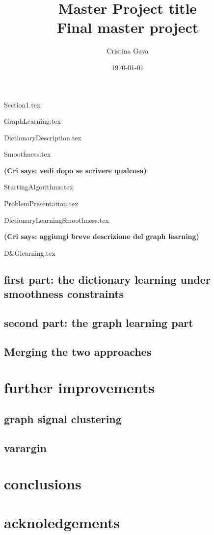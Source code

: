 \documentclass[11pt,a4paper,titlepage]{book}
\title{\blue Master Project title \\
\blueb Final master project}
\author{Cristina Gava}
\date{\today}
\newcommand{\cri}[1]{\textcolor{MyColor2}{\textbf{(Cri says: #1)}}}
\begin{document}
\maketitle

\tableofcontents

{Section1.tex}

{GraphLearning.tex}

{DictionaryDescription.tex}

{Smoothness.tex}

\cri{vedi dopo se scrivere qualcosa}

{StartingAlgorithms.tex}

{ProblemPresentation.tex}

{DictionaryLearningSmoothness.tex}

\cri{aggiungi breve descrizione del graph learning}

{D&Glearning.tex}

\subsection{first part: the dictionary learning under smoothness constraints}


\subsection{second part: the graph learning part}


\subsection{Merging the two approaches}


\section{further improvements}


\subsection{graph signal clustering}


\subsection{varargin}


\section{conclusions}


\section{acknoledgements}





\end{document}
